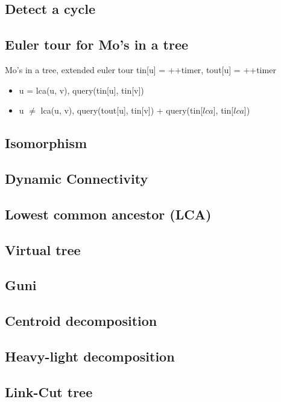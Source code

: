 \subsection{Detect a cycle}

\subsection{Euler tour for Mo's in a tree}
\vspace{-5pt}
Mo's in a tree, extended euler tour \small{tin[u] = ++timer, tout[u] = ++timer} 
\vspace{-5pt}
\begin{itemize}[noitemsep]
  \item u = lca(u, v), query(tin[u], tin[v]) 
  \item u $\neq$ lca(u, v), query(tout[u], tin[v]) + query(tin[$lca$], tin[$lca$])
\end{itemize}
\vspace{-10pt}

\subsection{Isomorphism}

\subsection{Dynamic Connectivity}



\subsection{Lowest common ancestor (LCA)}

\subsection{Virtual tree}

\subsection{Guni}

\subsection{Centroid decomposition}

\subsection{Heavy-light decomposition}

\subsection{Link-Cut tree}

